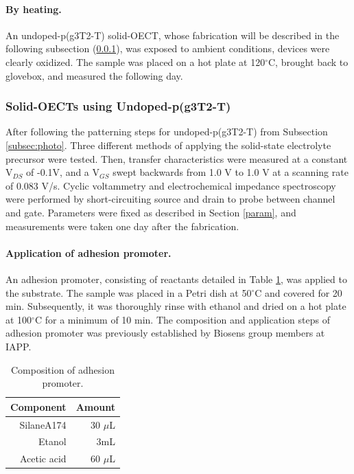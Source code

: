 \paragraph{By heating.}An undoped-p(g3T2-T) solid-OECT, whose fabrication will be described in the following subsection (\ref{subsec:solidOECT}), was exposed to ambient conditions, devices were clearly oxidized. The sample was placed on a hot plate at 120$^{\circ}$C, brought back to glovebox, and measured the following day.  %
\subsubsection{Solid-OECTs using Undoped-p(g3T2-T)} \label{subsec:solidOECT}
After following the patterning steps for undoped-p(g3T2-T) from Subsection \ref{subsec:photo}. Three different methods of applying the solid-state electrolyte precursor were tested. Then, transfer characteristics were measured at a constant V$_{DS}$ of -0.1V, and a  V$_{GS}$ swept backwards from 1.0 V to 1.0 V at a scanning rate of 0.083 V/s. Cyclic voltammetry and electrochemical impedance spectroscopy were performed by short-circuiting source and drain to probe between channel and gate. Parameters were fixed as described in Section \ref{param}, and measurements were taken one day after the fabrication.

\paragraph{Application of adhesion promoter.}An adhesion promoter, consisting of reactants detailed in Table \ref{tab:adprom}, was applied to the substrate. The sample was placed in a Petri dish at 50$^{\circ}$C and covered for 20 min. Subsequently, it was thoroughly rinse with ethanol and dried on a hot plate at 100$^{\circ}$C for a minimum of 10 min. The composition and application steps of adhesion promoter was previously established by Biosens group members at IAPP. 

\begin{table}[h]
	\centering
	\caption{Composition of adhesion promoter.}
	\begin{tabular}{r r} \hline
		Component   & Amount \\ \hline
		SilaneA174	& 30 $\mu$L \\ 
		Etanol   & 3mL \\ 
		Acetic acid   & 60 $\mu$L \\ \hline
	\end{tabular}
	\label{tab:adprom}
\end{table}

